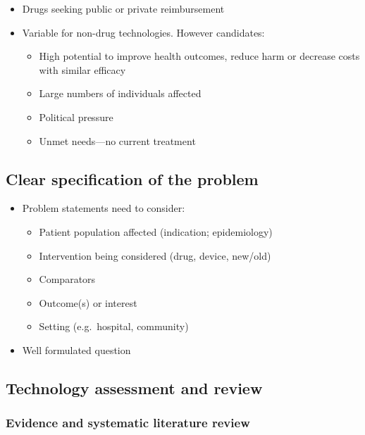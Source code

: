 \documentclass[
]{book}
\providecommand{\tightlist}{%
  \setlength{\itemsep}{0pt}\setlength{\parskip}{0pt}}
\begin{document}
\begin{itemize}
\tightlist
\item
  Drugs seeking public or private reimbursement
\item
  Variable for non-drug technologies. However candidates:

  \begin{itemize}
  \tightlist
  \item
    High potential to improve health outcomes, reduce harm or decrease costs with similar efficacy
  \item
    Large numbers of individuals affected
  \item
    Political pressure
  \item
    Unmet needs---no current treatment
  \end{itemize}
\end{itemize}

\hypertarget{clear-specification-of-the-problem}{%
\subsection{Clear specification of the problem}\label{clear-specification-of-the-problem}}

\begin{itemize}
\tightlist
\item
  Problem statements need to consider:

  \begin{itemize}
  \tightlist
  \item
    Patient population affected (indication; epidemiology)
  \item
    Intervention being considered (drug, device, new/old)
  \item
    Comparators
  \item
    Outcome(s) or interest
  \item
    Setting (e.g.~hospital, community)
  \end{itemize}
\item
  Well formulated question
\end{itemize}

\hypertarget{technology-assessment-and-review}{%
\subsection{Technology assessment and review}\label{technology-assessment-and-review}}

\hypertarget{evidence-and-systematic-literature-review}{%
\subsubsection{Evidence and systematic literature review}\label{evidence-and-systematic-literature-review}}
\end{document}

